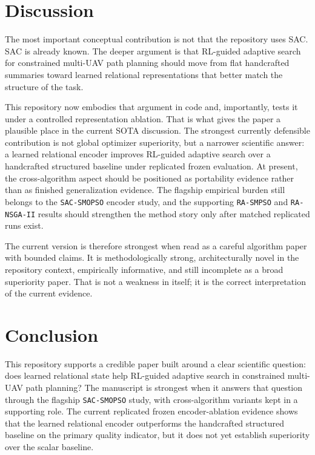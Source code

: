 \documentclass[a4paper,fleqn]{cas-dc}
\begin{document}
\section{Discussion}

The most important conceptual contribution is not that the repository uses SAC. SAC is already known. The deeper argument is that RL-guided adaptive search for constrained multi-UAV path planning should move from flat handcrafted summaries toward learned relational representations that better match the structure of the task.

This repository now embodies that argument in code and, importantly, tests it under a controlled representation ablation. That is what gives the paper a plausible place in the current SOTA discussion. The strongest currently defensible contribution is not global optimizer superiority, but a narrower scientific answer: a learned relational encoder improves RL-guided adaptive search over a handcrafted structured baseline under replicated frozen evaluation. At present, the cross-algorithm aspect should be positioned as portability evidence rather than as finished generalization evidence. The flagship empirical burden still belongs to the \texttt{SAC-SMOPSO} encoder study, and the supporting \texttt{RA-SMPSO} and \texttt{RA-NSGA-II} results should strengthen the method story only after matched replicated runs exist.

The current version is therefore strongest when read as a careful algorithm paper with bounded claims. It is methodologically strong, architecturally novel in the repository context, empirically informative, and still incomplete as a broad superiority paper. That is not a weakness in itself; it is the correct interpretation of the current evidence.

\section{Conclusion}

This repository supports a credible paper built around a clear scientific question: does learned relational state help RL-guided adaptive search in constrained multi-UAV path planning? The manuscript is strongest when it answers that question through the flagship \texttt{SAC-SMOPSO} study, with cross-algorithm variants kept in a supporting role. The current replicated frozen encoder-ablation evidence shows that the learned relational encoder outperforms the handcrafted structured baseline on the primary quality indicator, but it does not yet establish superiority over the scalar baseline.
\end{document}
